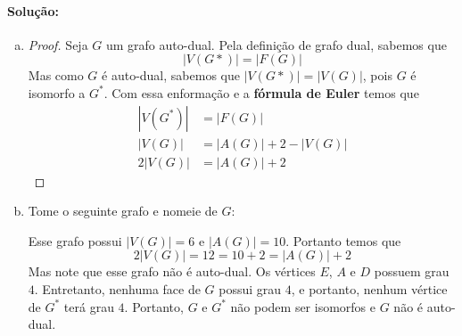 \documentclass[11pt,a4paper,notitlepage]{exam}
\begin{document}
    \paragraph{Solução:}
    \begin{enumerate}[a)]
        \item \begin{proof}
                Seja $G$ um grafo auto-dual. Pela
                definição de grafo dual, sabemos que 
                $$
                |V(G*)| = |F(G)|
                $$
                Mas como $G$ é auto-dual, sabemos que $|V(G*)| =
                |V(G)|$, pois $G$ é isomorfo a $G^*$. Com essa
                enformação e a \textbf{fórmula de Euler} temos que 
                \begin{align*}
                    |V(G^*)| &= |F(G)|\\
                    |V(G)| &= |A(G)| + 2 - |V(G)|\\
                    2|V(G)|&=|A(G)| + 2
                \end{align*}
              \end{proof}
              \newpage
          \item Tome o seguinte grafo e nomeie de $G$:
              \begin{center}
              \end{center}
              Esse grafo possui $|V(G)| = 6$ e $|A(G)| = 10$. Portanto
              temos que 
              $$
               2|V(G)| = 12 = 10 + 2 = |A(G)| + 2 
              $$
              Mas note que esse grafo não é auto-dual. Os vértices $E$,
              $A$ e $D$ possuem grau $4$. Entretanto, nenhuma face de
              $G$ possui grau $4$, e portanto, nenhum vértice de $G^*$
              terá grau $4$. Portanto, $G$ e $G^*$ não podem ser
              isomorfos e $G$ não é auto-dual.
    \end{enumerate}
\end{document}
